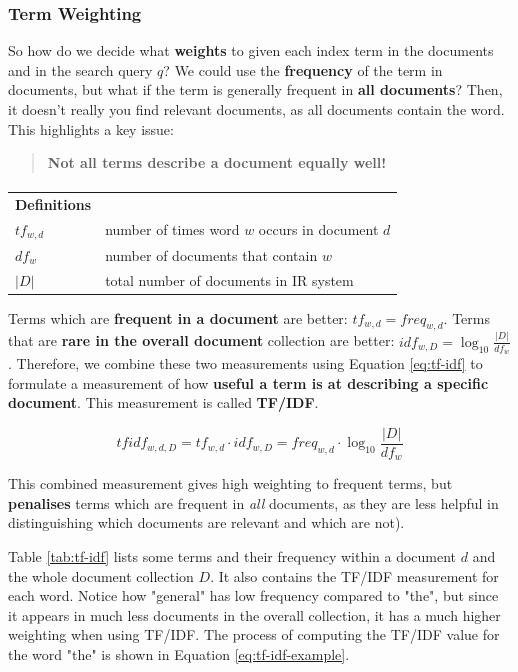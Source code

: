 \documentclass{article}
\begin{document}
\subsubsection{Term Weighting}

So how do we decide what \textbf{weights} to given each index term in the documents and in the search query $q$? We could use the \textbf{frequency} of the term in documents, but what if the term is generally frequent in \textbf{all documents}? Then, it doesn't really you find relevant documents, as all documents contain the word. This highlights a key issue:
\begin{quote}
	\textbf{Not all terms describe a document equally well!}
\end{quote}

\paragraph{}

\begin{tabular}{ll}
	\textbf{Definitions} & \\
	$tf_{w,d}$ & number of times word $w$ occurs in document $d$ \\
	$df_w$ & number of documents that contain $w$ \\
	$|D|$ & total number of documents in IR system 
\end{tabular}

Terms which are \textbf{frequent in a document} are better: $tf_{w,d} = freq_{w,d}$. Terms that are \textbf{rare in the overall document} collection are better: $idf_{w,D} = \log_{10} \frac{|D|}{df_w}$. Therefore, we combine these two measurements using Equation \ref{eq:tf-idf} to formulate a measurement of how \textbf{useful a term is at describing  a specific document}. This measurement is called \textbf{TF/IDF}.

\begin{equation}
	tfidf_{w,d,D} = tf_{w,d} \cdot idf_{w,D} = freq_{w,d} \cdot \log_{10} \frac{|D|}{df_w}
	\label{eq:tf-idf}
\end{equation}

This combined measurement gives high weighting to frequent terms, but \textbf{penalises} terms which are frequent in \textit{all} documents, as they are less helpful in distinguishing which documents are relevant and which are not).

Table \ref{tab:tf-idf} lists some terms and their frequency within a document $d$ and the whole document collection $D$. It also contains the TF/IDF measurement for each word. Notice how "general" has low frequency compared to "the", but since it appears in much less documents in the overall collection, it has a much higher weighting when using TF/IDF. The process of computing the TF/IDF value for the word "the" is shown in Equation \ref{eq:tf-idf-example}.
\end{document}
